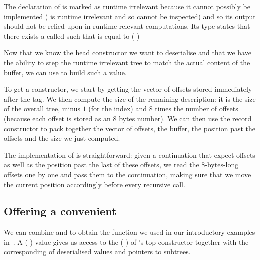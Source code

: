 
The declaration of  is marked as runtime
irrelevant because it cannot possibly be implemented
( is runtime irrelevant and so cannot be inspected)
and so its output should not be relied upon in runtime-relevant
computations.
%
Its type states that there exists a  called
 such that  is equal to
( \IdrisData{\#} )

Now that we know the head constructor we want to deserialise and that
we have the ability to step the runtime irrelevant tree to match the
actual content of the buffer, we can use 
to build such a value.


To get a constructor, we start by getting the vector of offsets stored
immediately after the tag. We then compute the size of the remaining
 description: it is the size of the overall tree,
minus $1$ (for the index) and $8$ times the number of offsets (because
each offset is stored as an 8 bytes number).
%
We can then use the record constructor  to pack
together the vector of offsets, the buffer, the position past the offsets
and the size we just computed.


The implementation of  is straightforward: given
a continuation that expect  offsets as well as the
position past the last of these offsets, we read the 8-bytes-long
offsets one by one and pass them to the continuation, making sure
that we move the current position accordingly before every recursive call.

\subsection{Offering a convenient }

We can combine  and  to obtain
the  function we used in our introductory examples
in~.
%
A (  ) value gives us
access to the ( ) of
's top constructor together with the corresponding
 of deserialised values and pointers to subtrees.

